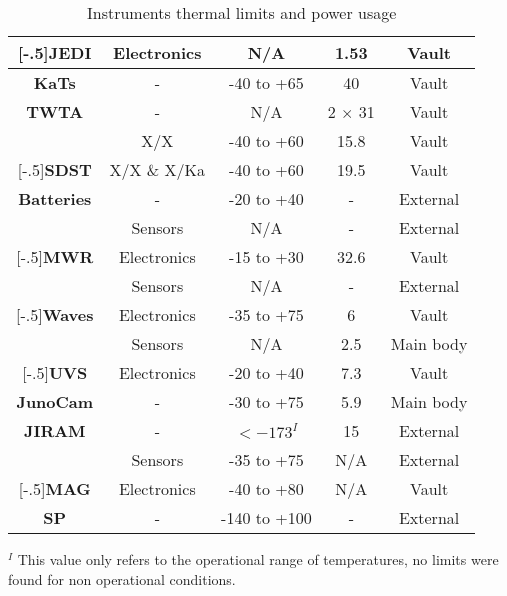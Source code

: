 \begin{table}[H]
\begin{tabular}{|c||c|c|c|c|}
        \hhline{|~|-|-|-|-|}
        \multirow{-2}{*}[-.5\arrayrulewidth]{\textbf{JEDI} \cite{JEDI_info}} &  Electronics & N/A & 1.53 & Vault \\
        \hline
        \textbf{KaTs} \cite{KaTs_info} & - & -40 to +65 & 40 & Vault \\
        \hline
        \textbf{TWTA} & - & N/A & 2 $\times$ 31 & Vault \\
        \hline
        & X/X & -40 to +60 & 15.8 & Vault \\
        \hhline{|~|-|-|-|-|}
        \multirow{-2}{*}[-.5\arrayrulewidth]{\textbf{SDST} \cite{SDST_info}} & X/X \& X/Ka & -40 to +60 & 19.5 & Vault \\
        \hline
        \textbf{Batteries} \cite{batteries_info} & - & -20 to +40 & - & External \\
        \hline
        & Sensors & N/A & - & External \\
        \hhline{|~|-|-|-|-|}
        \multirow{-2}{*}[-.5\arrayrulewidth]{\textbf{MWR} \cite{MWR_info}} & Electronics & -15 to +30 & 32.6 & Vault \\
        \hline
        & Sensors & N/A & - & External \\
        \hhline{|~|-|-|-|-|}
        \multirow{-2}{*}[-.5\arrayrulewidth]{\textbf{Waves} \cite{Waves_info}} & Electronics & -35 to +75 & 6 & Vault \\
        \hline
        & Sensors & N/A & 2.5 & Main body \\
        \hhline{|~|-|-|-|-|}
        \multirow{-2}{*}[-.5\arrayrulewidth]{\textbf{UVS} \cite{UVS_info}} & Electronics & -20 to +40 & 7.3 & Vault \\
        \hline
        \textbf{JunoCam} \cite{JunoCam_info} & - & -30 to +75 & 5.9 & Main body \\
        \hline
        \textbf{JIRAM} \cite{JIRAM_info} & - & $<-173^I$ & 15 & External \\
        \hline
        & Sensors & -35 to +75 & N/A & External \\
        \hhline{|~|-|-|-|-|}
        \multirow{-2}{*}[-.5\arrayrulewidth]{\textbf{MAG} \cite{MAG_info}} & Electronics & -40 to +80 & N/A & Vault \\
        \hline
        \textbf{SP} \cite{solar_panels_coef}& - & -140 to +100 & - & External \\
        \hline
    \end{tabular}
    \caption{Instruments thermal limits and power usage}
    \label{table:thermal_limits}
\end{table}

$^I$ This value only refers to the operational range of temperatures, no limits were found for non operational conditions.




